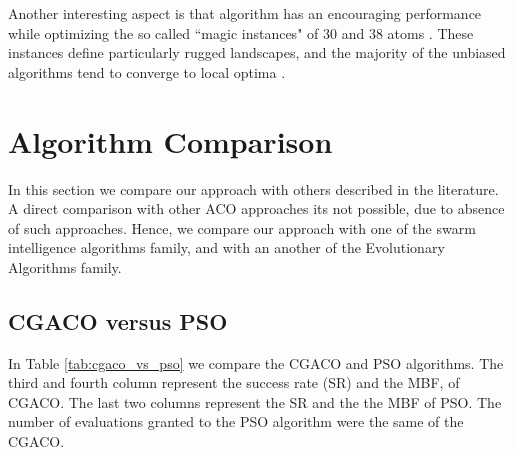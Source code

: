 	Another interesting aspect is that algorithm has an encouraging performance while optimizing the so called ``magic instances" of 30 and 38 atoms \cite{doye97}. These instances define particularly rugged landscapes, and the majority of the unbiased algorithms tend to converge to local optima \cite{doye97, grosso07}.
	
	\section{Algorithm Comparison}
	In this section we compare our approach with others described in the literature. A direct comparison with other ACO approaches its not possible, due to absence of such approaches. Hence, we compare our approach with one of the swarm intelligence algorithms family, and with an another of the Evolutionary Algorithms family.
	\subsection{CGACO versus PSO}
	In Table \ref{tab:cgaco_vs_pso} we compare the CGACO and PSO algorithms. The third and fourth column represent the success rate (SR) and the MBF, of CGACO. The last two columns represent the SR and the the MBF of PSO. The number of evaluations granted to the PSO algorithm were the same of the CGACO. 
	
